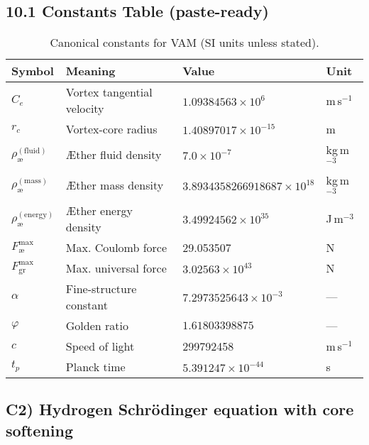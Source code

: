 \documentclass[11pt]{article}
\begin{document}
    \subsection*{10.1 Constants Table (paste-ready)}

    \begin{table}[h!]
        \centering
        \begin{tabular}{|l|l|l|l|}
            \hline
            \textbf{Symbol} & \textbf{Meaning} & \textbf{Value} & \textbf{Unit} \\
            \hline
            $C_e$ & Vortex tangential velocity & $1.09384563\times 10^{6}$ & m\,s$^{-1}$ \\
            $r_c$ & Vortex-core radius & $1.40897017\times 10^{-15}$ & m \\
            $\rho_{\text{\ae}}^{(\text{fluid})}$ & Æther fluid density & $7.0\times 10^{-7}$ & kg\,m$^{-3}$ \\
            $\rho_{\text{\ae}}^{(\text{mass})}$ & Æther mass density & $3.8934358266918687\times 10^{18}$ & kg\,m$^{-3}$ \\
            $\rho_{\text{\ae}}^{(\text{energy})}$ & Æther energy density & $3.49924562\times 10^{35}$ & J\,m$^{-3}$ \\
            $F_{\text{\ae}}^{\max}$ & Max. Coulomb force & 29.053507 & N \\
            $F_{\text{gr}}^{\max}$ & Max. universal force & $3.02563\times 10^{43}$ & N \\
            $\alpha$ & Fine-structure constant & $7.2973525643\times 10^{-3}$ & --- \\
            $\varphi$ & Golden ratio & $1.61803398875$ & --- \\
            $c$ & Speed of light & 299792458 & m\,s$^{-1}$ \\
            $t_p$ & Planck time & $5.391247\times 10^{-44}$ & s \\
            \hline
        \end{tabular}
        \caption{Canonical constants for VAM (SI units unless stated).}
    \end{table}


    \subsection*{C2) Hydrogen Schr\"odinger equation with core softening}
    \label{subsec:hydrogen-soft-core}
\end{document}
